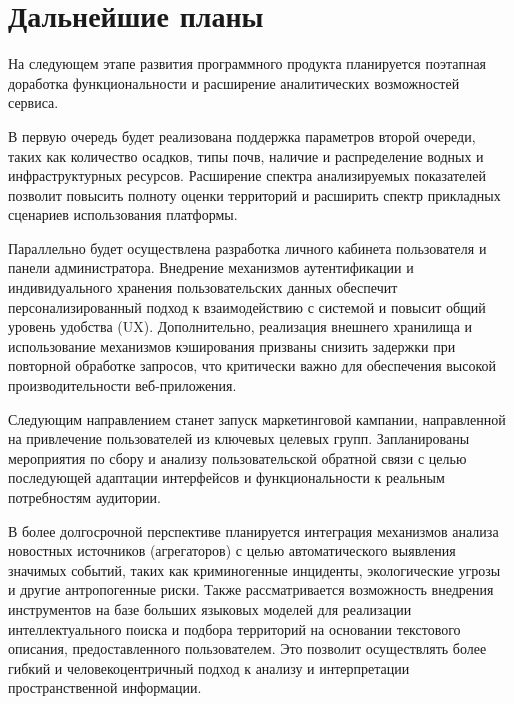 \chapter{Дальнейшие планы}

На следующем этапе развития программного продукта планируется поэтапная доработка функциональности и расширение аналитических возможностей сервиса.

В первую очередь будет реализована поддержка параметров второй очереди, таких как количество осадков, типы почв, наличие и распределение водных и инфраструктурных ресурсов. Расширение спектра анализируемых показателей позволит повысить полноту оценки территорий и расширить спектр прикладных сценариев использования платформы.

Параллельно будет осуществлена разработка личного кабинета пользователя и панели администратора. Внедрение механизмов аутентификации и индивидуального хранения пользовательских данных обеспечит персонализированный подход к взаимодействию с системой и повысит общий уровень удобства (UX). Дополнительно, реализация внешнего хранилища и использование механизмов кэширования призваны снизить задержки при повторной обработке запросов, что критически важно для обеспечения высокой производительности веб-приложения.

Следующим направлением станет запуск маркетинговой кампании, направленной на привлечение пользователей из ключевых целевых групп. Запланированы мероприятия по сбору и анализу пользовательской обратной связи с целью последующей адаптации интерфейсов и функциональности к реальным потребностям аудитории.

В более долгосрочной перспективе планируется интеграция механизмов анализа новостных источников (агрегаторов) с целью автоматического выявления значимых событий, таких как криминогенные инциденты, экологические угрозы и другие антропогенные риски. Также рассматривается возможность внедрения инструментов на базе больших языковых моделей для реализации интеллектуального поиска и подбора территорий на основании текстового описания, предоставленного пользователем. Это позволит осуществлять более гибкий и человекоцентричный подход к анализу и интерпретации пространственной информации.